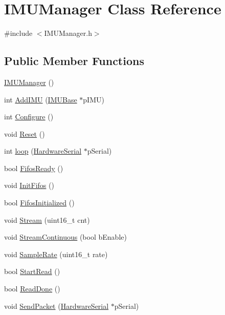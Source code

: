 \hypertarget{class_i_m_u_manager}{
\section{IMUManager Class Reference}
\label{class_i_m_u_manager}
}


{\ttfamily \#include $<$IMUManager.h$>$}

\subsection*{Public Member Functions}
\begin{DoxyCompactItemize}
\item 
\hyperlink{class_i_m_u_manager_aec0011e2e088e3b81d1f12a385c1a5af}{IMUManager} ()
\item 
int \hyperlink{class_i_m_u_manager_ae2c5bc34781f05fabb52b2398d99a478}{AddIMU} (\hyperlink{class_i_m_u_base}{IMUBase} $\ast$pIMU)
\item 
int \hyperlink{class_i_m_u_manager_aca76ad7b76af18f8d382f027d6071ed3}{Configure} ()
\item 
void \hyperlink{class_i_m_u_manager_a4c9b9022dde07117ce33e2f10777411f}{Reset} ()
\item 
int \hyperlink{class_i_m_u_manager_acb5d0ef42307637d0eb5c5353c7efd23}{loop} (\hyperlink{class_hardware_serial}{HardwareSerial} $\ast$pSerial)
\item 
bool \hyperlink{class_i_m_u_manager_aa5359a75b1ab7abeb7fae4c11d68f02a}{FifosReady} ()
\item 
void \hyperlink{class_i_m_u_manager_aeadc2e5d9e90583fbd4907ae8bdf4abc}{InitFifos} ()
\item 
bool \hyperlink{class_i_m_u_manager_a3506c09a57713cb85f51faa53d815246}{FifosInitialized} ()
\item 
void \hyperlink{class_i_m_u_manager_a249db3fbf9175733b738f2bc9fb81a99}{Stream} (uint16\_\-t cnt)
\item 
void \hyperlink{class_i_m_u_manager_a204f4340443daab9789f3dcb6734823f}{StreamContinuous} (bool bEnable)
\item 
void \hyperlink{class_i_m_u_manager_a65c8ae71428a8a842f23fd2d198e6bed}{SampleRate} (uint16\_\-t rate)
\item 
bool \hyperlink{class_i_m_u_manager_a1ee81029862706bba5e98f7b6bda4ba0}{StartRead} ()
\item 
bool \hyperlink{class_i_m_u_manager_ab03f9a4181227a8eb12f0ab7109909df}{ReadDone} ()
\item 
void \hyperlink{class_i_m_u_manager_a77624434206fac559a9794f992dd0411}{SendPacket} (\hyperlink{class_hardware_serial}{HardwareSerial} $\ast$pSerial)

\end{DoxyCompactItemize}
